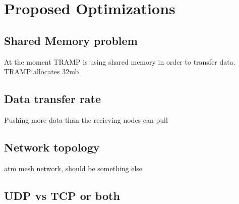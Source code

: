 \section{Proposed Optimizations}
\label{sec:optimizations}

\subsection{Shared Memory problem}
At the moment TRAMP is using shared memory in order to transfer data. TRAMP allocates 32mb

\subsection{Data transfer rate}
Pushing more data than the recieving nodes can pull

\subsection{Network topology}
atm mesh network, should be something else

\subsection{UDP vs TCP or both}






